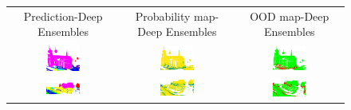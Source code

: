         \begin{figure}[h!]
            \centering
            \begin{tabular}{ccc}
                Prediction-Deep Ensembles & Probability map-Deep Ensembles & OOD map-Deep Ensembles \\
                \includegraphics[width=0.33\textwidth, height=0.18\textheight]{images/ood_imgs/de_sem3d/de_class_prob_1.png} &
                \includegraphics[width=0.33\textwidth, height=0.18\textheight]{images/ood_imgs/de_sem3d/de_prob_10_1.png}& 
                \includegraphics[width=0.33\textwidth, height=0.18\textheight]{images/ood_imgs/de_sem3d/de_ood_auroc_1.png}\\
    
                \includegraphics[width=0.33\textwidth, height=0.18\textheight]{images/ood_imgs/de_sem3d/de_class_prob_2.png} &
                \includegraphics[width=0.33\textwidth, height=0.18\textheight]{images/ood_imgs/de_sem3d/de_prob_10_2.png}& 
                \includegraphics[width=0.33\textwidth, height=0.18\textheight]{images/ood_imgs/de_sem3d/de_ood_auroc_2.png}\\
    

\end{tabular}
\end{figure}
